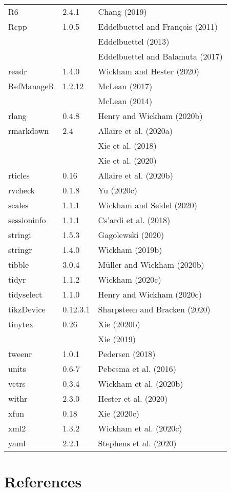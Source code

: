 \documentclass[utf8]{frontiersSCNS}
\begin{document}
\begin{longtable}[]{@{}lll@{}}
R6 & 2.4.1 & Chang (2019)\tabularnewline
Rcpp & 1.0.5 & Eddelbuettel and François (2011)\tabularnewline
& & Eddelbuettel (2013)\tabularnewline
& & Eddelbuettel and Balamuta (2017)\tabularnewline
readr & 1.4.0 & Wickham and Hester (2020)\tabularnewline
RefManageR & 1.2.12 & McLean (2017)\tabularnewline
& & McLean (2014)\tabularnewline
rlang & 0.4.8 & Henry and Wickham (2020b)\tabularnewline
rmarkdown & 2.4 & Allaire et al. (2020a)\tabularnewline
& & Xie et al. (2018)\tabularnewline
& & Xie et al. (2020)\tabularnewline
rticles & 0.16 & Allaire et al. (2020b)\tabularnewline
rvcheck & 0.1.8 & Yu (2020c)\tabularnewline
scales & 1.1.1 & Wickham and Seidel (2020)\tabularnewline
sessioninfo & 1.1.1 & Cs\a'ardi et al. (2018)\tabularnewline
stringi & 1.5.3 & Gagolewski (2020)\tabularnewline
stringr & 1.4.0 & Wickham (2019b)\tabularnewline
tibble & 3.0.4 & Müller and Wickham (2020b)\tabularnewline
tidyr & 1.1.2 & Wickham (2020c)\tabularnewline
tidyselect & 1.1.0 & Henry and Wickham (2020c)\tabularnewline
tikzDevice & 0.12.3.1 & Sharpsteen and Bracken (2020)\tabularnewline
tinytex & 0.26 & Xie (2020b)\tabularnewline
& & Xie (2019)\tabularnewline
tweenr & 1.0.1 & Pedersen (2018)\tabularnewline
units & 0.6-7 & Pebesma et al. (2016)\tabularnewline
vctrs & 0.3.4 & Wickham et al. (2020b)\tabularnewline
withr & 2.3.0 & Hester et al. (2020)\tabularnewline
xfun & 0.18 & Xie (2020c)\tabularnewline
xml2 & 1.3.2 & Wickham et al. (2020c)\tabularnewline
yaml & 2.2.1 & Stephens et al. (2020)\tabularnewline
\bottomrule
\end{longtable}

\hypertarget{references}{%
\section*{References}\label{references}}
\end{document}
